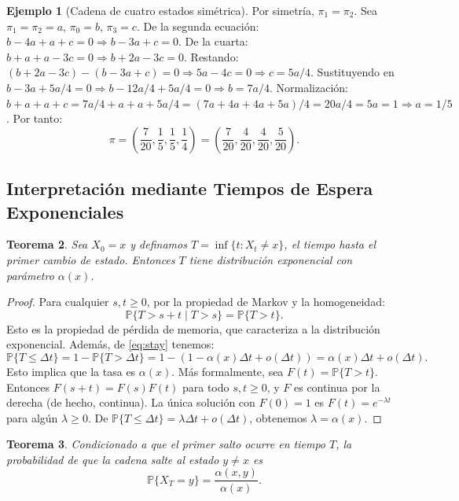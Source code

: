 \documentclass{article}
\theoremstyle{plain}
\newtheorem{Teorema}{Teorema}[section]
\theoremstyle{definition}
\newtheorem{Ejemplo}[Teorema]{Ejemplo}
\newcommand{\Prob}{\mathbb{P}}
\begin{document}
\begin{Ejemplo}[Cadena de cuatro estados simétrica]
  Por simetr\'ia, $\pi_1 = \pi_2$. Sea $\pi_1 = \pi_2 = a$, $\pi_0 = b$, $\pi_3 = c$. De la segunda ecuaci\'on: $b - 4a + a + c = 0 \Rightarrow b - 3a + c = 0$. De la cuarta: $b + a + a - 3c = 0 \Rightarrow b + 2a - 3c = 0$. Restando: $(b+2a-3c) - (b-3a+c) = 0 \Rightarrow 5a - 4c = 0 \Rightarrow c = 5a/4$. Sustituyendo en $b - 3a + 5a/4 = 0 \Rightarrow b - 12a/4 + 5a/4 = 0 \Rightarrow b = 7a/4$. Normalizaci\'on: $b + a + a + c = 7a/4 + a + a + 5a/4 = (7a+4a+4a+5a)/4 = 20a/4 = 5a = 1 \Rightarrow a = 1/5$. Por tanto:
  \[ \pi = \left(\frac{7}{20}, \frac{1}{5}, \frac{1}{5}, \frac{1}{4}\right) = \left(\frac{7}{20}, \frac{4}{20}, \frac{4}{20}, \frac{5}{20}\right). \]
\end{Ejemplo}

\subsection{Interpretaci\'on mediante Tiempos de Espera Exponenciales}

\begin{Teorema}
  Sea $X_0 = x$ y definamos $T = \inf\{t: X_t \neq x\}$, el tiempo hasta el primer cambio de estado. Entonces $T$ tiene distribuci\'on exponencial con par\'ametro $\alpha(x)$.
\end{Teorema}

\begin{proof}
  Para cualquier $s, t \geq 0$, por la propiedad de Markov y la homogeneidad:
  \[ \Prob\{T > s+t \mid T > s\} = \Prob\{T > t\}. \]
  Esto es la propiedad de p\'erdida de memoria, que caracteriza a la distribuci\'on exponencial. Adem\'as, de \eqref{eq:stay} tenemos:
  \[ \Prob\{T \leq \Delta t\} = 1 - \Prob\{T > \Delta t\} = 1 - (1 - \alpha(x)\Delta t + o(\Delta t)) = \alpha(x)\Delta t + o(\Delta t). \]
  Esto implica que la tasa es $\alpha(x)$. M\'as formalmente, sea $F(t) = \Prob\{T > t\}$. Entonces $F(s+t) = F(s)F(t)$ para todo $s,t \geq 0$, y $F$ es continua por la derecha (de hecho, continua). La \'unica soluci\'on con $F(0)=1$ es $F(t) = e^{-\lambda t}$ para alg\'un $\lambda \geq 0$. De $\Prob\{T \leq \Delta t\} = \lambda \Delta t + o(\Delta t)$, obtenemos $\lambda = \alpha(x)$.
\end{proof}

\begin{Teorema}
  Condicionado a que el primer salto ocurre en tiempo $T$, la probabilidad de que la cadena salte al estado $y \neq x$ es
  \[ \Prob\{X_T = y\} = \frac{\alpha(x,y)}{\alpha(x)}. \]
\end{Teorema}
\end{document}
